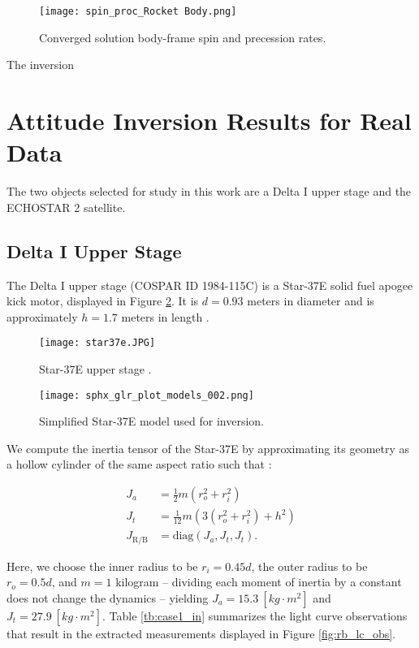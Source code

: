 \documentclass[a4paper,twocolumn]{spaceDebrisC} %
\newcommand{\figbig}[0]{0.5\textwidth}
\newcommand{\figsmall}[0]{0.3\textwidth}
\begin{document}
\begin{figure}[H]
  \centering
  \texttt{[image: spin\_proc\_Rocket Body.png]}
  \caption{Converged solution body-frame spin and precession rates.}
  \label{fig:spin_proc1}
\end{figure}

The inversion 

\section{Attitude Inversion Results for Real Data}

The two objects selected for study in this work are a Delta I upper stage and the ECHOSTAR 2 satellite.

\subsection{Delta I Upper Stage}

The Delta I upper stage (COSPAR ID 1984-115C) is a Star-37E \cite{delta3914_astronautix} solid fuel apogee kick motor, displayed in Figure \ref{fig:star37e}. It is $d=0.93$ meters in diameter and is approximately $h=1.7$ meters in length \cite{star37e_astronautix, star37_gunter}.

\begin{figure}[H]
  \centering
  \texttt{[image: star37e.JPG]}
  \caption{Star-37E upper stage \cite{star37_af}.}
  \label{fig:star37e}
\end{figure}

\begin{figure}[H]
  \centering
  \texttt{[image: sphx\_glr\_plot\_models\_002.png]}
  \caption{Simplified Star-37E model used for inversion.}
  \label{fig:star37e_simple}
\end{figure}

We compute the inertia tensor of the Star-37E by approximating its geometry as a hollow cylinder of the same aspect ratio such that \cite{serway2019}:

\begin{align}
 J_a &= \frac{1}{2} m \left(r_o^2+r_i^2\right) \\
 J_t &= \frac{1}{12} m \left(3 \left(r_o^2+r_i^2\right) + h^2\right) \\
 J_\text{R/B} &= \text{diag} \left(J_a, J_t, J_t\right).
\end{align}

Here, we choose the inner radius to be $r_i=0.45d$, the outer radius to be $r_o=0.5d$, and $m=1$ kilogram -- dividing each moment of inertia by a constant does not change the dynamics -- yielding $J_a = 15.3 \: [kg \cdot m^2]$ and $J_t = 27.9 \: [kg \cdot m^2]$. Table \ref{tb:case1_in} summarizes the light curve observations that result in the extracted measurements displayed in Figure \ref{fig:rb_lc_obs}.
\end{document}
